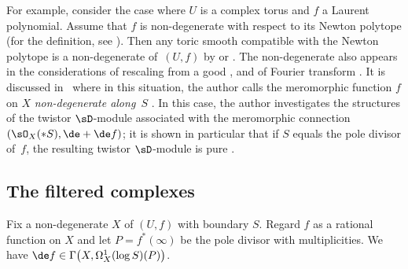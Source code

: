 For example, consider the case where $U$ is a complex torus and $f$ a Laurent polynomial. Assume that $f$ is non-degenerate with respect to its Newton polytope (for the definition, see \cite[Section~4]{Y}). Then any toric smooth {\cpt} compatible with the Newton polytope is a non-degenerate {\cpt} of~$(U,f)$ by \cite[Proposition~4.3]{Y} or \cite[Lemma~6.6]{M_GKZ}. The non-degenerate {\cpt} also appears in the considerations of rescaling
from a good {\cpt} \cite[Section~7.3]{SY}, and of Fourier transform \cite[Section~4]{S}. It is discussed in~\cite{M_GKZ} where in this situation, the author calls the meromorphic function $f$ on $X$ \textit{non-degenerate along~$S$} \cite[Definition~2.6]{M_GKZ}. In this case, the author investigates the structures of the twistor $\sD$-module associated with the meromorphic connection $(\sO_X(*S), \de +\de f)$; it is shown in particular that if $S$ equals the pole divisor of~$f$, the resulting twistor $\sD$-module is pure \cite[Lemma~2.10 and Corollary~3.12]{M_GKZ}.

\subsection{The filtered complexes}
Fix a non-degenerate {\cpt} $X$ of $(U,f)$ with boundary $S$. Regard $f$ as a rational function on $X$ and let $P = f^*(\infty)$ be the pole divisor with multiplicities. We have $\de f \in \Gamma\big(X,\Omega_X^1(\log S)(P)\big)$.


